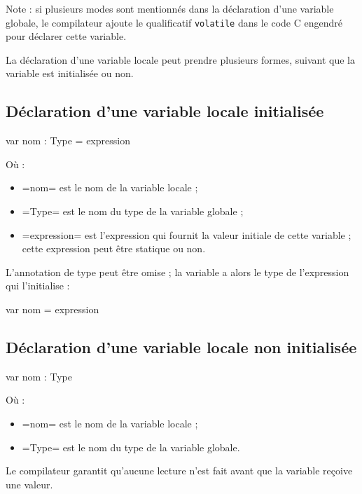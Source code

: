 Note : si plusieurs modes sont mentionnés dans la déclaration d'une variable globale, le compilateur ajoute le qualificatif \texttt{volatile} dans le code C engendré pour déclarer cette variable.





La déclaration d'une variable locale peut prendre plusieurs formes, suivant que la variable est initialisée ou non.

\subsection{Déclaration d'une variable locale initialisée}

\begin{PLM}
var nom : Type = expression
\end{PLM}

Où :
\begin{itemize}
  \item \plm=nom= est le nom de la variable locale ;
  \item \plm=Type= est le nom du type de la variable globale ;
  \item \plm=expression= est l'expression qui fournit la valeur initiale de cette variable ; cette expression peut être statique ou non.
\end{itemize}

L'annotation de type peut être omise ; la variable a alors le type de l'expression qui l'initialise :
\begin{PLM}
var nom = expression
\end{PLM}


\subsection{Déclaration d'une variable locale non initialisée}
\begin{PLM}
var nom : Type
\end{PLM}
Où :
\begin{itemize}
  \item \plm=nom= est le nom de la variable locale ;
  \item \plm=Type= est le nom du type de la variable globale.
\end{itemize}

Le compilateur garantit qu'aucune lecture n'est fait avant que la variable reçoive une valeur.

